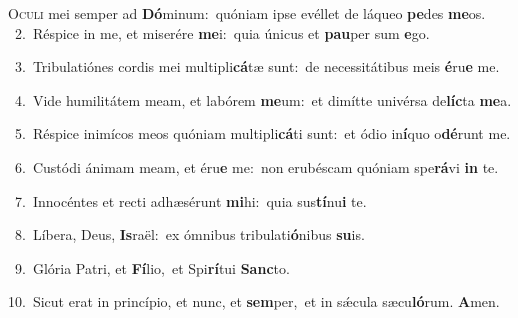 \lettrine{\initial\textcolor{\initialcolor}{O}}{culi} mei semper ad \textbf{Dó}\-minum:~\star quóniam ipse evéllet de láqueo \textbf{pe}\-des \textbf{me}\-os.\\
{\numbfont\textcolor{\numbcolor}{~2.}}~Réspice in me, et miserére \textbf{me}\-i:~\star quia únicus et \textbf{pau}\-per sum \textbf{e}\-go.\par
{\numbfont\textcolor{\numbcolor}{~3.}}~Tribulatiónes cordis mei multipli\-\textbf{cá}\-tæ sunt:~\star de necessitátibus meis \textbf{é}\-ru\textbf{e} me.\par
{\numbfont\textcolor{\numbcolor}{~4.}}~Vide humilitátem meam, et labórem \textbf{me}\-um:~\star et dimítte univérsa de\-\textbf{líc}\-ta \textbf{me}\-a.\par
{\numbfont\textcolor{\numbcolor}{~5.}}~Réspice inimícos meos quóniam multipli\-\textbf{cá}\-ti sunt:~\star et ódio in\-\textbf{í}\-quo o\-\textbf{dé}\-runt me.\par
{\numbfont\textcolor{\numbcolor}{~6.}}~Custódi ánimam meam, et éru\textbf{e} me:~\star non erubéscam quóniam spe\-\textbf{rá}\-vi \textbf{in} te.\par
{\numbfont\textcolor{\numbcolor}{~7.}}~Innocéntes et recti adhæsérunt \textbf{mi}\-hi:~\star quia sus\-\textbf{tí}\-nu\textbf{i} te.\par
{\numbfont\textcolor{\numbcolor}{~8.}}~Líbera, Deus, \textbf{Is}\-raël:~\star ex ómnibus tribulati\-\textbf{ó}\-nibus \textbf{su}\-is.\par
{\numbfont\textcolor{\numbcolor}{~9.}}~Glória Patri, et \textbf{Fí}\-lio,~\star et Spi\-\textbf{rí}\-tui \textbf{Sanc}\-to.\par
{\numbfont\textcolor{\numbcolor}{10.}}~Sicut erat in princípio, et nunc, et \textbf{sem}\-per,~\star et in sǽcula sæcu\-\textbf{ló}\-rum. \textbf{A}\-men.\par
